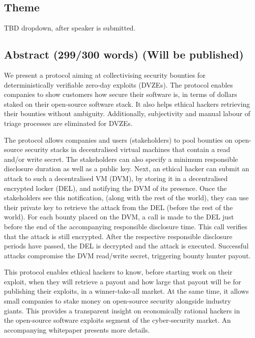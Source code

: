 \documentclass{article}
\begin{document}
\subsection*{Theme}
TBD dropdown, after speaker is submitted.
\subsection{Abstract (299/300 words) (Will be published)}
We present a protocol aiming at collectivising security bounties for deterministically verifiable zero-day exploits (DVZEs). The protocol enables companies to show customers how secure their software is, in terms of dollars staked on their open-source software stack. It also helps ethical hackers retrieving their bounties without ambiguity. Additionally, subjectivity and manual labour of triage processes are eliminated for DVZEs.

The protocol allows companies and users (stakeholders) to pool bounties on open-source security stacks in decentralised virtual machines that contain a read and/or write secret. The stakeholders can also specify a minimum responsible disclosure duration as well as a public key. Next, an ethical hacker can submit an attack to such a decentralised VM (DVM), by storing it in a decentralised encrypted locker (DEL), and notifying the DVM of its presence. Once the stakeholders see this notification, (along with the rest of the world), they can use their private key to retrieve the attack from the DEL (before the rest of the world). For each bounty placed on the DVM, a call is made to the DEL just before the end of the accompanying responsible disclosure time. This call verifies that the attack is still encrypted. After the respective responsible disclosure periods have passed, the DEL is decrypted and the attack is executed. Successful attacks compromise the DVM read/write secret, triggering bounty hunter payout.

This protocol enables ethical hackers to know, before starting work on their exploit, when they will retrieve a payout and how large that payout will be for publishing their exploits, in a winner-take-all market. At the same time, it allows small companies to stake money on open-source security alongside industry giants. This provides a transparent insight on economically rational hackers in the open-source software exploits segment of the cyber-security market. An accompanying whitepaper presents more details.

\end{document}
